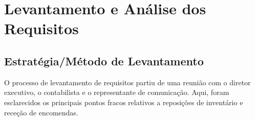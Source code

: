 
\newcommand{\freq}[3]{
    \parbox{\dimexpr\textwidth-2em}{
        \subsection{#1}
        \begin{itemize}[left=1em]
            \item \textbf{Definição:} #2
            \item \textbf{Especificação:} #3
        \end{itemize}
    }
}

\newcommand{\nreq}[2]{
    \parbox{\dimexpr\textwidth-2em}{
        \subsection{#1 (N/ Funcional)}
        \begin{itemize}[left=1em]
            \item \textbf{Definição:} #2
        \end{itemize}
    }
}



\chapter{Levantamento e Análise dos Requisitos}
    
    \section{Estratégia/Método de Levantamento}

    O processo de levantamento de requisitos partiu de uma reunião com o diretor executivo, o contabilista e o representante de comunicação. Aqui, foram esclarecidos os principais pontos fracos relativos a reposições de inventário e receção de encomendas.
    
